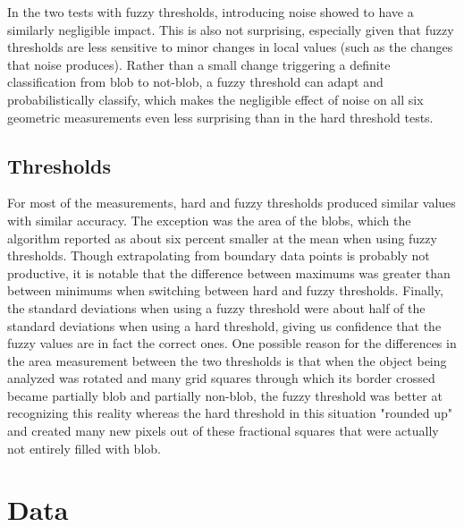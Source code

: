 \documentclass{article}
\begin{document}
\begin{doublespace}
\newpage
In the two tests with fuzzy thresholds, introducing noise showed to have a similarly negligible impact. This is also not surprising, especially given that fuzzy thresholds are less sensitive to minor changes in local values (such as the changes that noise produces). Rather than a small change triggering a definite classification from blob to not-blob, a fuzzy threshold can adapt and probabilistically classify, which makes the negligible effect of noise on all six geometric measurements even less surprising than in the hard threshold tests.


\subsection{Thresholds}
For most of the measurements, hard and fuzzy thresholds produced similar values with similar accuracy. The exception was the area of the blobs, which the algorithm reported as about six percent smaller at the mean when using fuzzy thresholds. Though extrapolating from boundary data points is probably not productive, it is notable that the difference between maximums was greater than between minimums when switching between hard and fuzzy thresholds. Finally, the standard deviations when using a fuzzy threshold were about half of the standard deviations when using a hard threshold, giving us confidence that the fuzzy values are in fact the correct ones. One possible reason for the differences in the area measurement between the two thresholds is that when the object being analyzed was rotated and many grid squares through which its border crossed became partially blob and partially non-blob, the fuzzy threshold was better at recognizing this reality whereas the hard threshold in this situation "rounded up" and created many new pixels out of these fractional squares that were actually not entirely filled with blob.

\newpage
\section{Data}


\end{doublespace}
\end{document}
